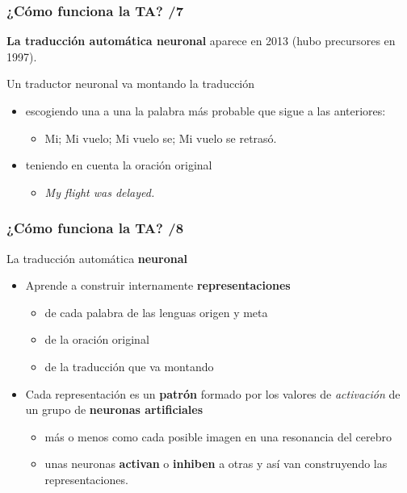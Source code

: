 \documentclass{beamer}
\begin{document}
\begin{frame}
\frametitle{¿Cómo funciona la TA? /7}
\textbf{La traducción automática neuronal} aparece en 2013 (hubo precursores en 1997).

Un traductor neuronal va montando la traducción
\begin{itemize}
\item escogiendo una a una la palabra más probable que sigue a las anteriores:
  \begin{itemize}
  \item Mi; Mi vuelo; Mi vuelo se; Mi vuelo se retrasó.
  \end{itemize}
\item teniendo en cuenta la oración original
  \begin{itemize}
  \item \emph{My flight was delayed.}
  \end{itemize}
\end{itemize}
\end{frame}

\begin{frame}
\frametitle{¿Cómo funciona la TA? /8}
La traducción automática \textbf{neuronal} 
\begin{itemize}
\item Aprende a construir internamente \textbf{representaciones}
  \begin{itemize}
  \item de cada palabra de las lenguas origen y meta
  \item de la oración original
  \item de la traducción que va montando
  \end{itemize}
\item Cada representación es un \textbf{patrón} formado por los valores de
  \emph{activación} de un grupo de \textbf{neuronas artificiales}
  \begin{itemize}
  \item más o menos como cada posible imagen en una resonancia del cerebro
  \item unas neuronas \textbf{activan} o \textbf{inhiben} a otras y así van construyendo las
    representaciones.
  \end{itemize}


\end{itemize}


\end{frame}
\end{document}
